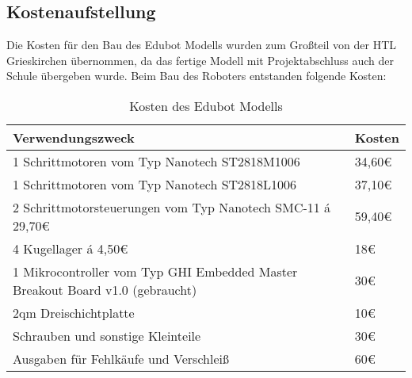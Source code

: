 \subsection{Kostenaufstellung}
Die Kosten für den Bau des Edubot Modells wurden zum Großteil von der HTL Grieskirchen übernommen, da das fertige Modell mit Projektabschluss auch der Schule übergeben wurde. Beim Bau des Roboters entstanden folgende Kosten:

\begin{table}[H]
\begin{tabular}{|p{11cm}|p{3cm}|}
\hline 
\textbf{Verwendungszweck} & \textbf{Kosten}\\
\hline
1 Schrittmotoren vom Typ Nanotech ST2818M1006 & 34,60\euro{}\\
\hline
1 Schrittmotoren vom Typ Nanotech ST2818L1006 & 37,10\euro{}\\
\hline
2 Schrittmotorsteuerungen vom Typ Nanotech SMC-11 á 29,70\euro{} & 59,40\euro{}\\
\hline
4 Kugellager á 4,50\euro{} & 18\euro{}\\
\hline
1 Mikrocontroller vom Typ GHI Embedded Master Breakout Board v1.0 (gebraucht) & 30\euro{}\\ 
\hline
2qm Dreischichtplatte & 10\euro{}\\ 
\hline
Schrauben und sonstige Kleinteile & 30\euro{}\\ 
\hline
Ausgaben für Fehlkäufe und Verschleiß & 60\euro{}\\ 
\hline
\end{tabular}
\caption{Kosten des Edubot Modells}
\end{table}